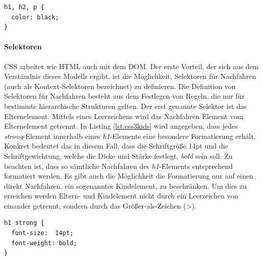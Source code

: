 \documentclass[12pt,a4paper,bibliography=totocnumbered,listof=totocnumbered]{scrartcl}
\begin{document}
	\vspace{1em}
	\begin{lstlisting}[caption=CSS3 Gruppierung, label=lst:css3group]
h1, h2, p {
  color: black;
}
	\end{lstlisting}

\paragraph{Selektoren} CSS arbeitet wie HTML auch mit dem \ac{DOM}. \glqq Der erste Vorteil, der sich aus dem Verständnis dieses Modells ergibt, ist die Möglichkeit, Selektoren für Nachfahren (auch als Kontext-Selektoren bezeichnet) zu definieren. Die Definition von Selektoren für Nachfahren besteht aus dem Festlegen von Regeln, die nur für bestimmte hierarchische Strukturen gelten.\grqq{}\cite[S.48]{MeyeCasc2005} Der erst genannte Selektor ist das Elternelement. Mittels eines Leerzeichens wird das Nachfahren Element vom Elternelement getrennt. In Listing \ref{lst:css3kids} wird angegeben, dass jedes \textit{strong}-Element innerhalb eines \textit{h1}-Elements eine besondere Formatierung erhält. Konkret bedeutet das in diesem Fall, dass die Schriftgröße 14pt und die Schriftgewichtung, welche die Dicke und Stärke festlegt, \textit{bold} sein soll. Zu beachten ist, dass so sämtliche Nachfahren des \textit{h1}-Elements entsprechend formatiert werden. Es gibt auch die Möglichkeit die Formatierung nur auf einen direkt Nachfahren, ein sogenanntes Kindelement, zu beschränken. Um dies zu erreichen werden Eltern- und Kindelement nicht durch ein Leerzeichen von einander getrennt, sondern durch das Größer-als-Zeichen (\textgreater).

	\vspace{1em}
	\begin{lstlisting}[caption=CSS3 Selektoren für Nachfahren, label=lst:css3kids]
h1 strong {
  font-size:  14pt;
  font-weight: bold;  
}
	\end{lstlisting}
\end{document}
